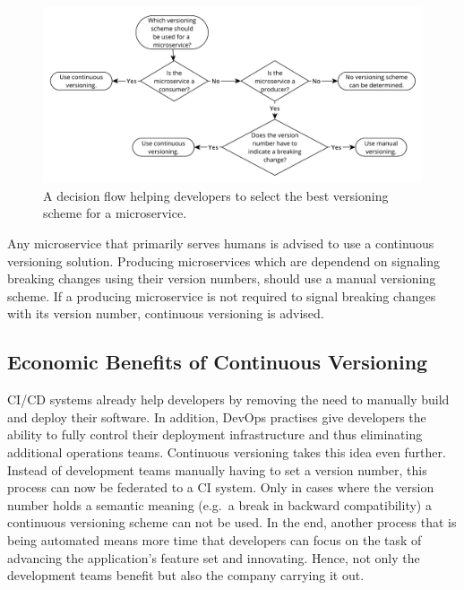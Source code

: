 \begin{figure}[H]
\begin{center}
  \includegraphics[scale=0.55]{images/figures/versioning_decision_flow.pdf}
\end{center}
\caption{A decision flow helping developers to select the best versioning
  scheme for a microservice.}%
\label{fig:versioning_decision_flow}
\end{figure}

Any microservice that primarily serves humans is advised to use a continuous
versioning solution. Producing microservices which are dependend on signaling
breaking changes using their version numbers, should use a manual versioning
scheme. If a producing microservice is not required to signal breaking changes
with its version number, continuous versioning is advised.

\subsection{Economic Benefits of Continuous Versioning}%
\label{sub:Economic_Benefits_of_Continuous_Versioning}
\ac{CI}/\ac{CD} systems already help developers by removing the need to
manually build and deploy their software. In addition, DevOps practises give
developers the ability to fully control their deployment infrastructure and
thus eliminating additional operations teams. Continuous versioning takes this
idea even further. Instead of development teams manually having to set a
version number, this process can now be federated to a \ac{CI} system. Only in
cases where the version number holds a semantic meaning (e.g.\ a break in
backward compatibility) a continuous versioning scheme can not be used. In the
end, another process that is being automated means more time that developers can
focus on the task of advancing the application's feature set and innovating.
Hence, not only the development teams benefit but also the company carrying it
out.
